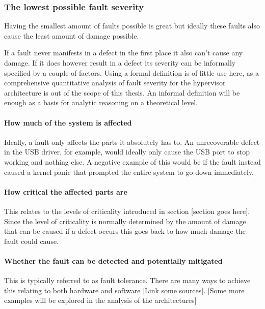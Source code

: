 \subsubsection{The lowest possible fault severity}
Having the smallest amount of faults possible is great but ideally these faults also cause the least amount of damage possible. 

If a fault never manifests in a defect in the first place it also can't cause any damage. If it does however result in a defect its severity can be informally specified by a couple of factors. Using a formal definition is of little use here, as a comprehensive quantitative analysis of fault severity for the hypervisor architecture is out of the scope of this thesis. An informal definition will be enough as a basis for analytic reasoning on a theoretical level.
\paragraph{How much of the system is affected}
Ideally,  a fault only affects the parts it absolutely has to. An unrecoverable defect in the USB driver, for example, would ideally only cause the USB port to stop working and nothing else. A negative example of this would be if the fault instead caused a kernel panic that prompted the entire system to go down immediately.
\paragraph{How critical the affected parts are}
This relates to the levels of criticality introduced in section [section goes here]. Since the level of criticality is normally determined by the amount of damage that can be caused if a defect occurs this goes back to how much damage the fault could cause. 
\paragraph{Whether the fault can be detected and potentially mitigated}
This is typically referred to as fault tolerance. There are many ways to achieve this relating to both hardware and software [Link some sources]. [Some more examples will be explored in the analysis of the architectures]

